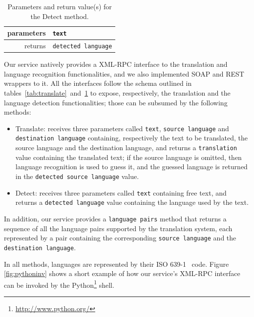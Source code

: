 \documentclass[11pt]{article}
\begin{document}
\begin{table}[!ht]
\begin{center}
 \begin{tabular}{|r|l|}
  \hline
   parameters	& {\tt\small text} \\
  \hline \hline
   returns 	& {\tt\small detected language}\\
  \hline
 \end{tabular}
\end{center}
\caption{Parameters and return value(s) for the Detect method.}
\label{tab:detect}
\end{table}

Our service natively provides a XML-RPC interface to the translation and language recognition functionalities, and we also implemented SOAP and REST wrappers to it. All the interfaces follow the schema outlined in tables~\ref{tab:translate}~and~\ref{tab:detect} to expose, respectively, the translation and the language detection functionalities; those can be subsumed by the following methods:

\begin{itemize}
 \item Translate: receives three parameters called {\tt\small text}, {\tt\small source language} and {\tt\small destination language} containing, respectively the text to be translated, the source language and the destination language, and returns a {\tt\small translation} value containing the translated text; if the source language is omitted, then language recognition is used to guess it, and the guessed language is returned in the {\tt\small detected source language} value.
 \item Detect: receives three parameters called {\tt\small text} containing free text, and returns a {\tt\small detected language} value containing the language used by the text.
\end{itemize}

In addition, our service provides a {\tt\small language pairs} method that returns a sequence of all the language pairs supported by the translation system, each represented by a pair containing the corresponding {\tt\small source language} and the {\tt\small destination language}.


In all methods, languages are represented by their ISO 639-1~\citep{ISO:639-1} code. Figure \ref{fig:pythoninv} shows a short example of how our service's XML-RPC interface can be invoked by the Python\footnote{\small\url{http://www.python.org/}} shell.
\end{document}
